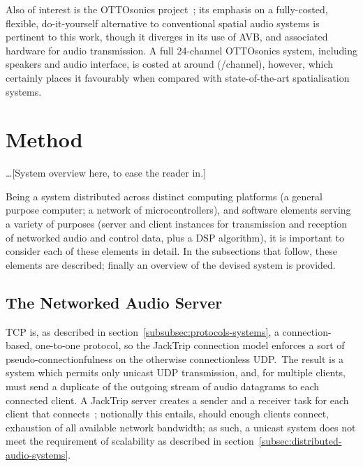 \documentclass[utf8]{FrontiersinHarvard}
\newcommand{\secref}[1]{section~\ref{#1}}
\begin{document}
    Also of interest is the OTTOsonics
    project~\citep{mitterhuber_ottosonics_2022};
    its emphasis on a fully-costed, flexible, do-it-yourself alternative to
    conventional spatial audio systems is pertinent to this work, though it
    diverges in its use of AVB, and associated hardware for audio transmission.
    A full 24-channel OTTOsonics system, including speakers and audio interface,
    is costed at around  (/channel), however,
    which certainly places it favourably when compared with state-of-the-art
    spatialisation systems.

    \section{Method}\label{sec:method}

    \dots [System overview here, to ease the reader in.]

    Being a system distributed across distinct computing platforms (a general
    purpose computer; a network of microcontrollers), and software elements
    serving a variety of purposes (server and client instances for transmission
    and reception of networked audio and control data, plus a DSP algorithm), it is
    important to consider each of these elements in detail.
    In the subsections that follow, these elements are described;
    finally an overview of the devised system is provided.

    \subsection{The Networked Audio Server}\label{subsec:the-networked-audio-server}

    TCP is, as described in \secref{subsubsec:protocols-systems}, a
    connection-based, one-to-one protocol, so the JackTrip connection model enforces
    a sort of pseudo-connectionfulness on the otherwise connectionless UDP.\
    The result is a system which permits only unicast UDP transmission, and, for
    multiple clients, must send a duplicate of the outgoing stream of audio
    datagrams to each connected client.
    A JackTrip server creates a sender and a receiver task for each client that
    connects~\citep{caceres_jacktrip_2010};
    notionally this entails, should enough clients connect, exhaustion of all
    available network bandwidth;
    as such, a unicast system does not meet the requirement of scalability as
    described in \secref{subsec:distributed-audio-systems}.
\end{document}
